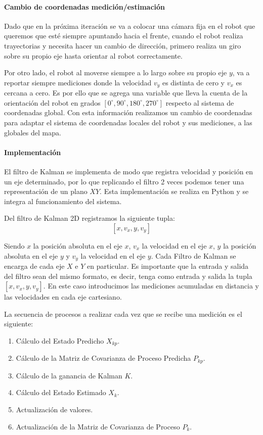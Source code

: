 \paragraph{Cambio de coordenadas medición/estimación} \mbox{} \vspace{8pt}

Dado que en la próxima iteración se va a colocar una cámara fija en el robot que queremos que esté siempre apuntando hacia el frente, cuando el robot realiza trayectorias y necesita hacer un cambio de dirección, primero realiza un giro sobre su propio eje hasta orientar al robot correctamente.

Por otro lado, el robot al moverse siempre a lo largo sobre su propio eje $y$, va a reportar siempre mediciones donde la velocidad $v_y$ es distinta de cero y $v_x$ es cercana a cero. Es por ello que se agrega una variable que lleva la cuenta de la orientación del robot en grados $[0^{\circ}, 90^{\circ}, 180^{\circ}, 270^{\circ}]$ respecto al sistema de coordenadas global. Con esta información realizamos un cambio de coordenadas para adaptar el sistema de coordenadas locales del robot y sus mediciones, a las globales del mapa.

\paragraph{Implementación} \mbox{} \vspace{8pt}

El filtro de Kalman se implementa de modo que registra velocidad y posición en un eje determinado, por lo que replicando el filtro 2 veces podemos tener una representación de un plano $XY$. Esta implementación se realiza en Python y se integra al funcionamiento del sistema.

Del filtro de Kalman 2D registramos la siguiente tupla:
$$ [x, v_x, y, v_y] $$

Siendo $x$ la posición absoluta en el eje $x$, $v_x$ la velocidad en el eje $x$, $y$ la posición absoluta en el eje $y$ y $v_y$ la velocidad en el eje $y$. Cada Filtro de Kalman se encarga de cada eje $X$ e $Y$ en particular.
Es importante que la entrada y salida del filtro sean del mismo formato, es decir, tenga como entrada y salida la tupla $[x, v_x, y, v_y]$. En este caso introducimos las mediciones acumuladas en distancia y las velocidades en cada eje cartesiano.

La secuencia de procesos a realizar cada vez que se recibe una medición es el siguiente:
\begin{enumerate}
    \item Cálculo del Estado Predicho $X_{kp}$.
    \item Cálculo de la Matriz de Covarianza de Proceso Predicha $P_{kp}$.
    \item Cálculo de la ganancia de Kalman $K$.
    \item Cálculo del Estado Estimado $X_k$.
    \item Actualización de valores.
    \item Actualización de la Matriz de Covarianza de Proceso $P_k$.
\end{enumerate}

